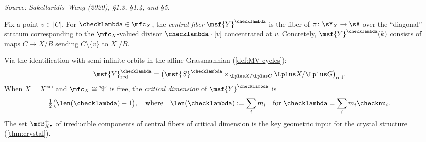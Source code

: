 \begin{definition}
  \label{def:central-fibers}
%
  \textit{Source: Sakellaridis--Wang (2020), §1.3, §1.4, and §5.}

  Fix a point \( v \in |C| \).  For \( \checklambda \in \mfc_X \), the
  \emph{central fiber} \( \msf{Y}^{\checklambda} \) is the fiber of
  \( \pi \colon \sY_X \to \sA \) over the ``diagonal'' stratum corresponding to the
  \( \mfc_X \)-valued divisor \( \checklambda \cdot [v] \) concentrated at \( v \).
  Concretely, \( \msf{Y}^{\checklambda}(k) \) consists of maps
  \( C \to X/B \) sending \( C \setminus \{v\} \) to \( X^\circ/B \).

  Via the identification with semi-infinite orbits in the affine Grassmannian
  (\cref{def:MV-cycles}):
  \[
    \msf{Y}^{\checklambda}_{\mathrm{red}}
      = \bigl(\msf{S}^{\checklambda} \times_{\Lplus X/\Lplus G}
              \Lplus X/\Lplus G \bigr)_{\mathrm{red}}.
  \]
  When \( X = X^{\mathrm{can}} \) and \( \mfc_X \cong \mathbb{N}^r \) is free, the
  \emph{critical dimension} of \( \msf{Y}^{\checklambda} \) is
  \[
    \tfrac{1}{2}\bigl(\len(\checklambda) - 1\bigr),
    \quad \text{where}\quad
    \len(\checklambda) := \sum_i m_i
    \quad \text{for } \checklambda = \sum_i m_i \checknu_i.
  \]
  The set \( \mfB_{X^\bullet}^+ \) of irreducible components of central fibers of critical
  dimension is the key geometric input for the crystal structure
  (\cref{thm:crystal}).
\end{definition}

